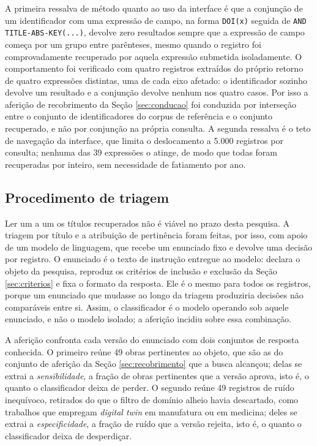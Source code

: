 {\setlength{\emergencystretch}{3em}%
A primeira ressalva de método quanto ao uso da interface é que a conjunção de um identificador com uma expressão de campo, na forma \texttt{DOI(x)} seguida de \texttt{AND TITLE-ABS-KEY(...)}, devolve zero resultados sempre que a expressão de campo começa por um grupo entre parênteses, mesmo quando o registro foi comprovadamente recuperado por aquela expressão submetida isoladamente. O comportamento foi verificado com quatro registros extraídos do próprio retorno de quatro expressões distintas, uma de cada eixo afetado: o identificador sozinho devolve um resultado e a conjunção devolve nenhum nos quatro casos. Por isso a aferição de recobrimento da Seção \ref{sec:conducao} foi conduzida por interseção entre o conjunto de identificadores do corpus de referência e o conjunto recuperado, e não por conjunção na própria consulta. A segunda ressalva é o teto de navegação da interface, que limita o deslocamento a 5.000 registros por consulta; nenhuma das 39 expressões o atinge, de modo que todas foram recuperadas por inteiro, sem necessidade de fatiamento por ano.\par}

\subsection{Procedimento de triagem}
\label{sec:procedimento-triagem}

Ler um a um os títulos recuperados não é viável no prazo desta pesquisa. A triagem por título e a atribuição de pertinência foram feitas, por isso, com apoio de um modelo de linguagem, que recebe um enunciado fixo e devolve uma decisão por registro. O enunciado é o texto de instrução entregue ao modelo: declara o objeto da pesquisa, reproduz os critérios de inclusão e exclusão da Seção \ref{sec:criterios} e fixa o formato da resposta. Ele é o mesmo para todos os registros, porque um enunciado que mudasse ao longo da triagem produziria decisões não comparáveis entre si. Assim, o classificador é o modelo operando sob aquele enunciado, e não o modelo isolado; a aferição incidiu sobre essa combinação.

A aferição confronta cada versão do enunciado com dois conjuntos de resposta conhecida. O primeiro reúne 49 obras pertinentes ao objeto, que são as do conjunto de aferição da Seção \ref{sec:recobrimento} que a busca alcançou; delas se extrai a \textit{sensibilidade}, a fração de obras pertinentes que a versão aprova, isto é, o quanto o classificador deixa de perder. O segundo reúne 49 registros de ruído inequívoco, retirados do que o filtro de domínio alheio havia descartado, como trabalhos que empregam \textit{digital twin} em manufatura ou em medicina; deles se extrai a \textit{especificidade}, a fração de ruído que a versão rejeita, isto é, o quanto o classificador deixa de desperdiçar.

